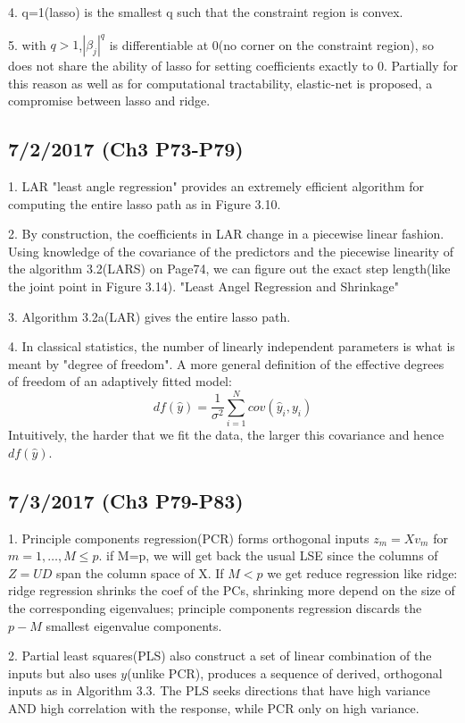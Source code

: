 \documentclass[a4paper, 12pt]{article}
\begin{document}
4. q=1(lasso) is the smallest q such that the constraint region is convex.

5. with $q>1$,$|\beta_j|^q$ is differentiable at 0(no corner on the constraint region), so does not share the ability of lasso for setting coefficients exactly to 0. Partially for this reason as well as for computational tractability, elastic-net is proposed, a compromise between lasso and ridge.

\subsection*{7/2/2017 (Ch3 P73-P79)}

1. LAR "least angle regression" provides an extremely efficient algorithm for computing the entire lasso path as in Figure 3.10.

2. By construction, the coefficients in LAR change in a piecewise linear fashion. Using knowledge of the covariance of the predictors and the piecewise linearity of the algorithm 3.2(LARS) on Page74, we can figure out the exact step length(like the joint point in Figure 3.14). "Least Angel Regression and Shrinkage"

3. Algorithm 3.2a(LAR) gives the entire lasso path.

4. In classical statistics, the number of linearly independent parameters is what is meant by "degree of freedom". A more general definition of the effective degrees of freedom of an adaptively fitted model:$$df(\hat{y})=\frac{1}{\sigma^2}\sum_{i=1}^{N}cov(\hat{y}_i,y_i)$$
Intuitively, the harder that we fit the data, the larger this covariance and hence $df(\hat{y})$.

\subsection*{7/3/2017 (Ch3 P79-P83)}

1. Principle components regression(PCR) forms orthogonal inputs $z_m=Xv_m$ for $m=1,\ldots,M \le p$. if M=p, we will get back the usual LSE since the columns of $Z=UD$ span the column space of X. If $M < p$ we get reduce regression like ridge: ridge regression shrinks the coef of the PCs, shrinking more depend on the size of the corresponding eigenvalues; principle components regression discards the $p-M$ smallest eigenvalue components.

2. Partial least squares(PLS) also construct a set of linear combination of the inputs but also uses $y$(unlike PCR), produces a sequence of derived, orthogonal inputs as in Algorithm 3.3. The PLS seeks directions that have high variance AND high correlation with the response, while PCR only on high variance. 
\end{document}

